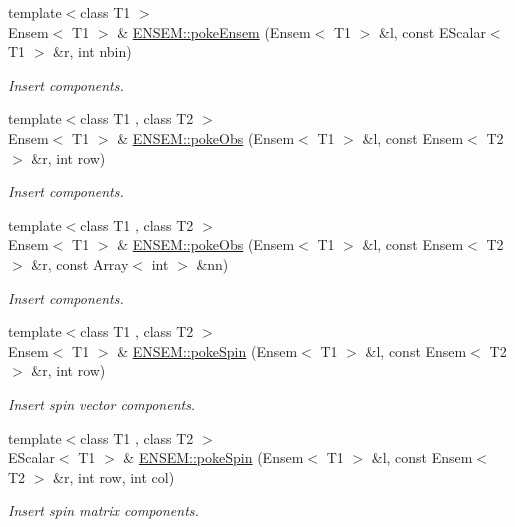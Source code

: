 \begin{DoxyCompactItemize}
\item 
{\footnotesize template$<$class T1 $>$ }\\Ensem$<$ T1 $>$ \& \mbox{\hyperlink{group__eensem_gac250f0269fc0f62be437e1f400b3b7b9}{E\+N\+S\+E\+M\+::poke\+Ensem}} (Ensem$<$ T1 $>$ \&l, const E\+Scalar$<$ T1 $>$ \&r, int nbin)
\begin{DoxyCompactList}\small\item\em Insert components. \end{DoxyCompactList}\item 
{\footnotesize template$<$class T1 , class T2 $>$ }\\Ensem$<$ T1 $>$ \& \mbox{\hyperlink{group__eensem_ga44fada3144f6b1bb4d161722a389abd9}{E\+N\+S\+E\+M\+::poke\+Obs}} (Ensem$<$ T1 $>$ \&l, const Ensem$<$ T2 $>$ \&r, int row)
\begin{DoxyCompactList}\small\item\em Insert components. \end{DoxyCompactList}\item 
{\footnotesize template$<$class T1 , class T2 $>$ }\\Ensem$<$ T1 $>$ \& \mbox{\hyperlink{group__eensem_gaf4969f408bf59ed0fb219c61def36156}{E\+N\+S\+E\+M\+::poke\+Obs}} (Ensem$<$ T1 $>$ \&l, const Ensem$<$ T2 $>$ \&r, const Array$<$ int $>$ \&nn)
\begin{DoxyCompactList}\small\item\em Insert components. \end{DoxyCompactList}\item 
{\footnotesize template$<$class T1 , class T2 $>$ }\\Ensem$<$ T1 $>$ \& \mbox{\hyperlink{group__eensem_ga20ff818f34faa2f1d5067da3ff139ba9}{E\+N\+S\+E\+M\+::poke\+Spin}} (Ensem$<$ T1 $>$ \&l, const Ensem$<$ T2 $>$ \&r, int row)
\begin{DoxyCompactList}\small\item\em Insert spin vector components. \end{DoxyCompactList}\item 
{\footnotesize template$<$class T1 , class T2 $>$ }\\E\+Scalar$<$ T1 $>$ \& \mbox{\hyperlink{group__eensem_ga21cbf6a127bd98e6cf1909afe3050089}{E\+N\+S\+E\+M\+::poke\+Spin}} (Ensem$<$ T1 $>$ \&l, const Ensem$<$ T2 $>$ \&r, int row, int col)
\begin{DoxyCompactList}\small\item\em Insert spin matrix components. \end{DoxyCompactList}\item 

\end{DoxyCompactItemize}
